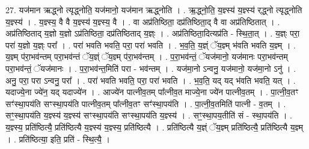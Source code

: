 \documentclass[17pt]{extarticle}
\begin{document}
27. यज॑मान ऋद्ध्नो त्यृद्ध्नोति॒ यज॑मानो॒ यज॑मान ऋद्ध्नोति । . ऋ॒द्ध्नो॒ति॒ य॒ज्ञ्स्य॑ य॒ज्ञ्स्य॑ र्‌द्ध्नो त्यृद्ध्नोति य॒ज्ञ्स्य॑ । . य॒ज्ञ्स्य॒ वै वै य॒ज्ञ्स्य॑ य॒ज्ञ्स्य॒ वै । . वा अप्र॑तिष्ठिता॒ दप्र॑तिष्ठिता॒द् वै वा अप्र॑तिष्ठितात् । . अप्र॑तिष्ठिताद् य॒ज्ञो य॒ज्ञो ऽप्र॑तिष्ठिता॒ दप्र॑तिष्ठिताद् य॒ज्ञ्ः । . अप्र॑तिष्ठिता॒दित्यप्र॑ति - स्थि॒ता॒त् । . य॒ज्ञ्ः परा॒ परा॑ य॒ज्ञो य॒ज्ञ्ः परा᳚ । . परा॑ भवति भवति॒ परा॒ परा॑ भवति । . भ॒व॒ति॒ य॒ज्ञ्ं ॅय॒ज्ञ्म् भ॑वति भवति य॒ज्ञ्म् । . य॒ज्ञ्म् प॑रा॒भव॑न्तम् परा॒भव॑न्तं ॅय॒ज्ञ्ं ॅय॒ज्ञ्म् प॑रा॒भव॑न्तम् । . प॒रा॒भव॑न्तं॒ ॅयज॑मानो॒ यज॑मानः परा॒भव॑न्तम् परा॒भव॑न्तं॒ ॅयज॑मानः । . प॒रा॒भव॑न्त॒मिति॑ परा - भव॑न्तम् । . यज॑मा॒नो ऽन्वनु॒ यज॑मानो॒ यज॑मा॒नो ऽनु॑ । . अनु॒ परा॒ परा ऽन्वनु॒ परा᳚ । . परा॑ भवति भवति॒ परा॒ परा॑ भवति । . भ॒व॒ति॒ यद् यद् भ॑वति भवति॒ यत् । . यदाज्ये॒ना ज्ये॑न॒ यद् यदाज्ये॑न । . आज्ये॑न पात्नीव॒तम् पा᳚त्नीव॒त माज्ये॒ना ज्ये॑न पात्नीव॒तम् । . पा॒त्नी॒व॒तꣳ सꣳ॑स्था॒पय॑ति सꣳस्था॒पय॑ति पात्नीव॒तम् पा᳚त्नीव॒तꣳ सꣳ॑स्था॒पय॑ति । . पा॒त्नी॒व॒तमिति॑ पात्नी - व॒तम् । . सꣳ॒॒स्था॒पय॑ति य॒ज्ञ्स्य॑ य॒ज्ञ्स्य॑ सꣳस्था॒पय॑ति सꣳस्था॒पय॑ति य॒ज्ञ्स्य॑ । . सꣳ॒॒स्था॒पय॒तीति॑ सं - स्था॒पय॑ति । . य॒ज्ञ्स्य॒ प्रति॑ष्ठित्यै॒ प्रति॑ष्ठित्यै य॒ज्ञ्स्य॑ य॒ज्ञ्स्य॒ प्रति॑ष्ठित्यै । . प्रति॑ष्ठित्यै य॒ज्ञ्ं ॅय॒ज्ञ्म् प्रति॑ष्ठित्यै॒ प्रति॑ष्ठित्यै य॒ज्ञ्म् । . प्रति॑ष्ठित्या॒ इति॒ प्रति॑ - स्थि॒त्यै॒ । \newline
\end{document}
